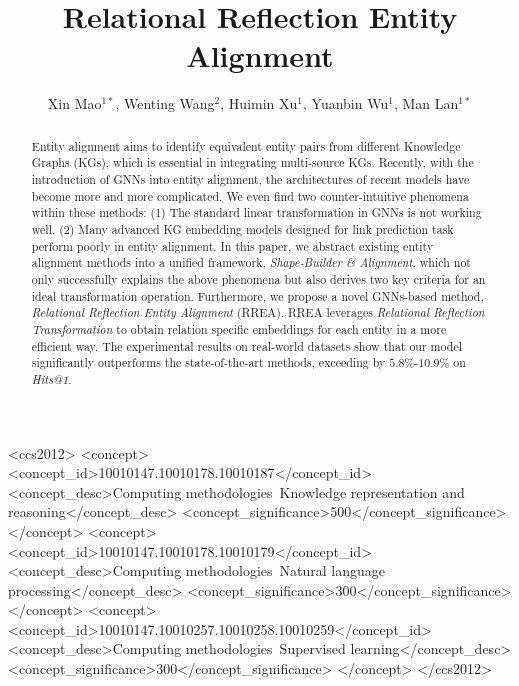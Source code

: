 \documentclass[sigconf,camera-ready]{acmart}
\begin{document}
\fancyhead{}
\title{Relational Reflection Entity Alignment}

\author{Xin Mao$^{1*}$, Wenting Wang$^2$, Huimin Xu$^1$, Yuanbin Wu$^1$, Man Lan$^{1*}$}





\begin{abstract}
Entity alignment aims to identify equivalent entity pairs from different Knowledge Graphs (KGs), which is essential in integrating multi-source KGs. 
Recently, with the introduction of GNNs into entity alignment, the architectures of recent models have become more and more complicated.
We even find two counter-intuitive phenomena within these methods:
(1) The standard linear transformation in GNNs is not working well.
(2) Many advanced KG embedding models designed for link prediction task perform poorly in entity alignment.
In this paper, we abstract existing entity alignment methods into a unified framework, \emph{Shape-Builder \& Alignment},
which not only successfully explains the above phenomena but also derives two key criteria for an ideal transformation operation.
Furthermore, we propose a novel GNNs-based method, \emph{Relational Reflection Entity Alignment} (RREA).
RREA leverages \emph{Relational Reflection Transformation} to obtain relation specific embeddings for each entity in a more efficient way.
The experimental results on real-world datasets show that our model significantly outperforms the state-of-the-art methods, exceeding by $5.8\%$-$10.9\%$ on \emph{Hits@1}.
\end{abstract}

\begin{CCSXML}
<ccs2012>
<concept>
<concept_id>10010147.10010178.10010187</concept_id>
<concept_desc>Computing methodologies~Knowledge representation and reasoning</concept_desc>
<concept_significance>500</concept_significance>
</concept>
<concept>
<concept_id>10010147.10010178.10010179</concept_id>
<concept_desc>Computing methodologies~Natural language processing</concept_desc>
<concept_significance>300</concept_significance>
</concept>
<concept>
<concept_id>10010147.10010257.10010258.10010259</concept_id>
<concept_desc>Computing methodologies~Supervised learning</concept_desc>
<concept_significance>300</concept_significance>
</concept>
</ccs2012>
\end{CCSXML}
\end{document}
